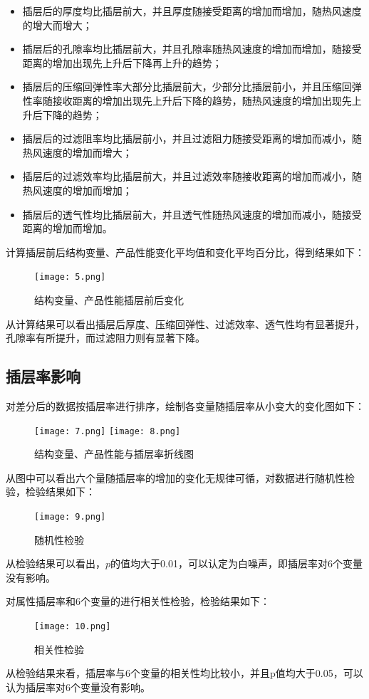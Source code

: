 \documentclass[withoutpreface,bwprint]{cumcmthesis} %
\begin{document}
\begin{itemize}
\item 插层后的厚度均比插层前大，并且厚度随接受距离的增加而增加，随热风速度的增大而增大；
\item 插层后的孔隙率均比插层前大，并且孔隙率随热风速度的增加而增加，随接受距离的增加出现先上升后下降再上升的趋势；
\item 插层后的压缩回弹性率大部分比插层前大，少部分比插层前小，并且压缩回弹性率随接收距离的增加出现先上升后下降的趋势，随热风速度的增加出现先上升后下降的趋势；
\item 插层后的过滤阻率均比插层前小，并且过滤阻力随接受距离的增加而减小，随热风速度的增加而增大；
\item 插层后的过滤效率均比插层前大，并且过滤效率随接收距离的增加而减小，随热风速度的增加而增加；
\item 插层后的透气性均比插层前大，并且透气性随热风速度的增加而减小，随接受距离的增加而增加。
\end{itemize}

计算插层前后结构变量、产品性能变化平均值和变化平均百分比，得到结果如下：
   \begin{figure}[H]
	\centering
	\texttt{[image: 5.png]}
	\caption{结构变量、产品性能插层前后变化}
	\label{6}
\end{figure}
从计算结果可以看出插层后厚度、压缩回弹性、过滤效率、透气性均有显著提升，孔隙率有所提升，而过滤阻力则有显著下降。


\subsection{插层率影响}
对差分后的数据按插层率进行排序，绘制各变量随插层率从小变大的变化图如下：
   \begin{figure}[H]
	\centering
	\texttt{[image: 7.png]}	\texttt{[image: 8.png]}
	\caption{结构变量、产品性能与插层率折线图}
	\label{78}
\end{figure}
从图中可以看出六个量随插层率的增加的变化无规律可循，对数据进行随机性检验，检验结果如下：
   \begin{figure}[H]
	\centering
	\texttt{[image: 9.png]}	
	\caption{随机性检验}
	\label{8}
\end{figure}
从检验结果可以看出，$p$的值均大于0.01，可以认定为白噪声，即插层率对6个变量没有影响。

对属性插层率和6个变量的进行相关性检验，检验结果如下：
   \begin{figure}[H]
	\centering
	\texttt{[image: 10.png]}	
	\caption{相关性检验}
	\label{9}
\end{figure}
从检验结果来看，插层率与6个变量的相关性均比较小，并且p值均大于0.05，可以认为插层率对6个变量没有影响。
\end{document}
